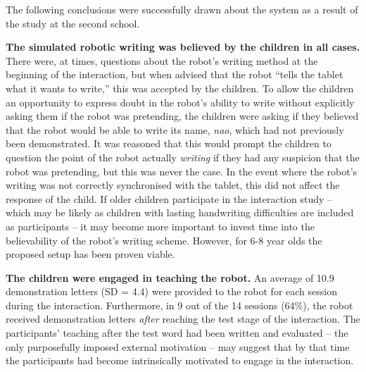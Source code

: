 \documentclass{sig-alternate}
\begin{document}
The following conclusions were successfully drawn about the system as a result
of the study at the second school.


    \textbf{The simulated robotic writing was believed by the children in all
    cases.} There were, at times, 
    questions about the robot's writing method at the beginning of the interaction,
    but when advised that the robot ``tells the tablet what it wants to write,''
    this was accepted by the children. To allow the children an opportunity to
    express doubt in the robot's ability to write without explicitly asking them if
    the robot was pretending, the children were asking if they believed that the
    robot would be able to write its name, \emph{{\sc nao}}, which had not previously been
    demonstrated. It was reasoned that this would prompt the children to question
    the point of the robot actually \emph{writing} if they had any suspicion that
    the robot was pretending, but this was never the case. In the event where the
    robot's writing was not correctly synchronised with the tablet, this did not affect the
    response of the child. If older children participate in the interaction study --
    which may be likely as children with lasting handwriting difficulties are included
    as participants -- it may become more important to invest time into the
    believability of the robot's writing scheme. However, for 6-8 year olds the
    proposed setup has been proven viable.

    \textbf{The children were engaged in teaching the robot.} %
    An average of 10.9 demonstration letters (SD = 4.4) were
    provided to the robot for each session during the interaction. Furthermore,
    in 9 out of the 14 sessions (64\%), the robot received demonstration letters
    \emph{after} reaching the test stage of the interaction. The participants'
    teaching after the test word had been written and evaluated -- the only
    purposefully imposed external motivation -- may suggest that by that time
    the participants had become intrinsically motivated to engage in the
    interaction.%
\end{document}
